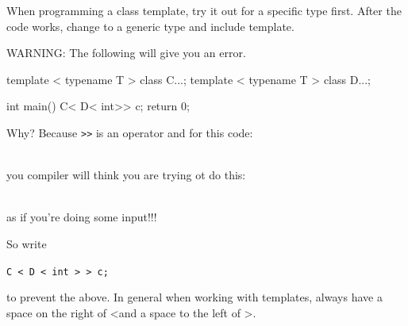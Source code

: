 When programming a class template, try it out for a specific type first.
After the code works, change to a generic type and include template.

WARNING: The following will give you an error.

\begin{console}
template < typename T > class C{...};
template < typename T > class D{...};

int main()
{    
     C< D< int>> c;
     return 0;
} 
\end{console}

Why? Because \texttt{>>} is an operator and for
this code:

\\

you compiler will think you are trying ot do this:

\\

as if you're doing some input!!!

So write
\begin{center}
\texttt{C < D < int > > c;}
\end{center}
to prevent the above. In general when working with templates, always have a space on the right of \textless and a space to the left of \textgreater.

